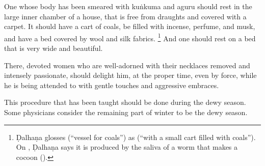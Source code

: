 \begin{translation}
	\item[30--31]
	One whose body has been smeared with \gls{kuṅkuma} and \gls{aguru} %
	should rest %
	in the large %
	inner chamber of a house,  %
	that is free from draughts %
	and covered with a carpet. %
	It should have a cart of coals, %
	be filled with incense, perfume, and musk,  %
	and have a bed covered by wool and silk fabrics.%
	\footnote{
		Ḍalhaṇa \citep[810]{vulgate} glosses  (``vessel for coals'') as  (``with a small cart filled with coals''). On , Ḍalhaṇa \citep[86]{vulgate} says it is produced by the saliva of a worm that makes a cocoon ().
	} %
	And one should rest on a bed that is %
	very wide %
	and beautiful. %

	\item[32] %
	There, %
	devoted %
	women who are well-adorned %
	with their necklaces removed %
	and intensely passionate, %
	should delight him, %
	at the proper time, %
	even by force, %
	while he is being attended to %
	with gentle touches %
	and aggressive embraces. %


	\item[33]
	This procedure %
	that has been taught should be done during the dewy season. %
	Some physicians consider the remaining part of winter to be the dewy season.


\end{translation}

